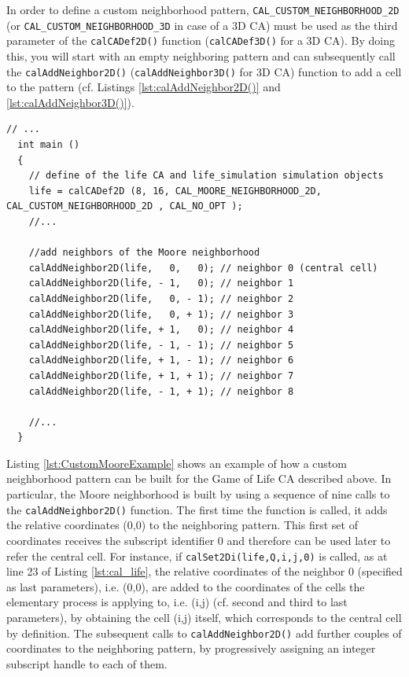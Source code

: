 In order to define a custom neighborhood pattern,
\verb'CAL_CUSTOM_NEIGHBORHOOD_2D' (or
\verb'CAL_CUSTOM_NEIGHBORHOOD_3D' in case of a 3D CA) must be used as
the third parameter of the \verb'calCADef2D()' function
(\verb'calCADef3D()' for a 3D CA). By doing this, you will start with an
empty neighboring pattern and can subsequently call the
\verb'calAddNeighbor2D()' (\verb'calAddNeighbor3D()' for 3D CA)
function to add a cell to the pattern (cf. Listings
\ref{lst:calAddNeighbor2D()} and \ref{lst:calAddNeighbor3D()}).

\begin{lstlisting}[float, label=lst:CustomMooreExample, caption=Example of custom neighbourhood pattern; the sequence of calls to the calAddNeighbor2D() function defines the Moore neighbourhood for the Game of Life CA., numbers=none]
  // ...
  int main ()
  {
    // define of the life CA and life_simulation simulation objects
    life = calCADef2D (8, 16, CAL_MOORE_NEIGHBORHOOD_2D, CAL_CUSTOM_NEIGHBORHOOD_2D , CAL_NO_OPT );
    //...

    //add neighbors of the Moore neighborhood
    calAddNeighbor2D(life,   0,   0); // neighbor 0 (central cell)
    calAddNeighbor2D(life, - 1,   0); // neighbor 1
    calAddNeighbor2D(life,   0, - 1); // neighbor 2
    calAddNeighbor2D(life,   0, + 1); // neighbor 3
    calAddNeighbor2D(life, + 1,   0); // neighbor 4
    calAddNeighbor2D(life, - 1, - 1); // neighbor 5
    calAddNeighbor2D(life, + 1, - 1); // neighbor 6
    calAddNeighbor2D(life, + 1, + 1); // neighbor 7
    calAddNeighbor2D(life, - 1, + 1); // neighbor 8

    //...
  }
\end{lstlisting}

Listing \ref{lst:CustomMooreExample} shows an example of how a custom
neighborhood pattern can be built for the Game of Life CA described
above. In particular, the Moore neighborhood is built by using a
sequence of nine calls to the \verb'calAddNeighbor2D()' function. The
first time the function is called, it adds the relative coordinates
(0,0) to the neighboring pattern. This first set of coordinates
receives the subscript identifier 0 and therefore can be used later to
refer the central cell. For instance, if
\verb'calSet2Di(life,Q,i,j,0)' is called, as at line 23 of Listing
\ref{lst:cal_life}, the relative coordinates of the neighbor 0
(specified as last parameters), i.e. (0,0), are added to the
coordinates of the cells the elementary process is applying to,
i.e. (i,j) (cf. second and third to last parameters), by obtaining the
cell (i,j) itself, which corresponds to the central cell by
definition. The subsequent calls to \verb'calAddNeighbor2D()' add
further couples of coordinates to the neighboring pattern, by
progressively assigning an integer subscript handle to each of
them.

